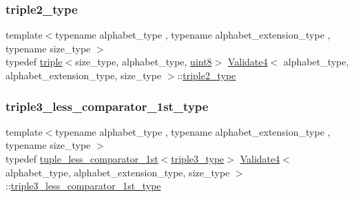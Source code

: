 \subsubsection{\texorpdfstring{triple2\+\_\+type}{triple2\_type}}
{\footnotesize\ttfamily template$<$typename alphabet\+\_\+type , typename alphabet\+\_\+extension\+\_\+type , typename size\+\_\+type $>$ \\
typedef \hyperlink{structtriple}{triple}$<$size\+\_\+type, alphabet\+\_\+type, \hyperlink{types_8h_a115946cb5fc5879545e9ccea096a6031}{uint8}$>$ \hyperlink{class_validate4}{Validate4}$<$ alphabet\+\_\+type, alphabet\+\_\+extension\+\_\+type, size\+\_\+type $>$\+::\hyperlink{class_validate4_a1e1065b2bd86208beeec8aea6edd3ddd}{triple2\+\_\+type}\hspace{0.3cm}{\ttfamily [private]}}

\mbox{\label{class_validate4_a473516f742b15338b55ec169c794f7ca}} 
\subsubsection{\texorpdfstring{triple3\+\_\+less\+\_\+comparator\+\_\+1st\+\_\+type}{triple3\_less\_comparator\_1st\_type}}
{\footnotesize\ttfamily template$<$typename alphabet\+\_\+type , typename alphabet\+\_\+extension\+\_\+type , typename size\+\_\+type $>$ \\
typedef \hyperlink{structtuple__less__comparator__1st}{tuple\+\_\+less\+\_\+comparator\+\_\+1st}$<$\hyperlink{class_validate4_a2bc9345c182543a419af47b6c8bd37d2}{triple3\+\_\+type}$>$ \hyperlink{class_validate4}{Validate4}$<$ alphabet\+\_\+type, alphabet\+\_\+extension\+\_\+type, size\+\_\+type $>$\+::\hyperlink{class_validate4_a473516f742b15338b55ec169c794f7ca}{triple3\+\_\+less\+\_\+comparator\+\_\+1st\+\_\+type}\hspace{0.3cm}{\ttfamily [private]}}

\mbox{\label{class_validate4_ac2e4bde5df51eeff18ef5591d76e63dc}} 
